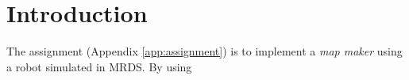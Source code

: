 \section{Introduction}
\label{sec:intro}
The assignment (Appendix \ref{app:assignment}) is to implement a \textit{map maker}
 using a robot simulated\cite{murhpy} in MRDS\cite{MRDS}. By using 



